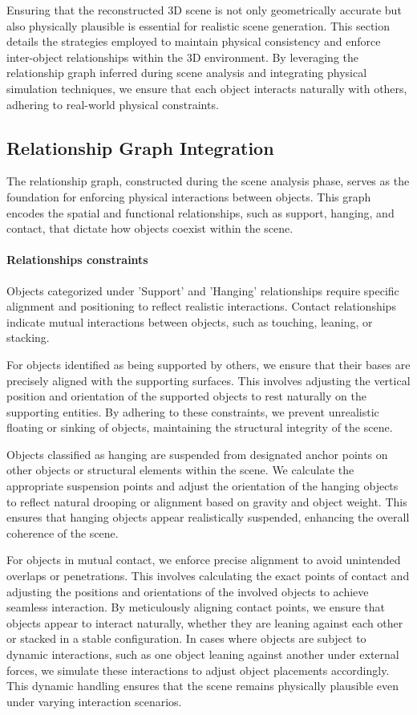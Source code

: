 

Ensuring that the reconstructed 3D scene is not only geometrically accurate but also physically plausible is essential for realistic scene generation. This section details the strategies employed to maintain physical consistency and enforce inter-object relationships within the 3D environment. By leveraging the relationship graph inferred during scene analysis and integrating physical simulation techniques, we ensure that each object interacts naturally with others, adhering to real-world physical constraints.



\subsection{Relationship Graph Integration}
The relationship graph, constructed during the scene analysis phase, serves as the foundation for enforcing physical interactions between objects. This graph encodes the spatial and functional relationships, such as support, hanging, and contact, that dictate how objects coexist within the scene.

\paragraph{Relationships constraints}
Objects categorized under 'Support' and 'Hanging' relationships require specific alignment and positioning to reflect realistic interactions. Contact relationships indicate mutual interactions between objects, such as touching, leaning, or stacking.

For objects identified as being supported by others, we ensure that their bases are precisely aligned with the supporting surfaces. This involves adjusting the vertical position and orientation of the supported objects to rest naturally on the supporting entities. By adhering to these constraints, we prevent unrealistic floating or sinking of objects, maintaining the structural integrity of the scene.

Objects classified as hanging are suspended from designated anchor points on other objects or structural elements within the scene. We calculate the appropriate suspension points and adjust the orientation of the hanging objects to reflect natural drooping or alignment based on gravity and object weight. This ensures that hanging objects appear realistically suspended, enhancing the overall coherence of the scene.

For objects in mutual contact, we enforce precise alignment to avoid unintended overlaps or penetrations. This involves calculating the exact points of contact and adjusting the positions and orientations of the involved objects to achieve seamless interaction. By meticulously aligning contact points, we ensure that objects appear to interact naturally, whether they are leaning against each other or stacked in a stable configuration. In cases where objects are subject to dynamic interactions, such as one object leaning against another under external forces, we simulate these interactions to adjust object placements accordingly. This dynamic handling ensures that the scene remains physically plausible even under varying interaction scenarios.

